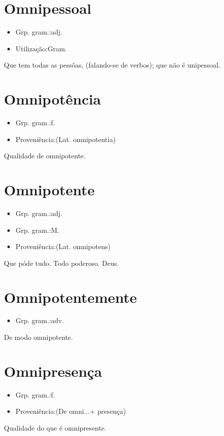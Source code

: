 \section{Omnipessoal}
\begin{itemize}
\item {Grp. gram.:adj.}
\end{itemize}
\begin{itemize}
\item {Utilização:Gram.}
\end{itemize}
Que tem todas as pessôas, (falando-se de verbos); que não é unipessoal.
\section{Omnipotência}
\begin{itemize}
\item {Grp. gram.:f.}
\end{itemize}
\begin{itemize}
\item {Proveniência:(Lat. \textunderscore omnipotentia\textunderscore )}
\end{itemize}
Qualidade de omnipotente.
\section{Omnipotente}
\begin{itemize}
\item {Grp. gram.:adj.}
\end{itemize}
\begin{itemize}
\item {Grp. gram.:M.}
\end{itemize}
\begin{itemize}
\item {Proveniência:(Lat. \textunderscore omnipotens\textunderscore )}
\end{itemize}
Que póde tudo.
Todo poderoso.
Deus.
\section{Omnipotentemente}
\begin{itemize}
\item {Grp. gram.:adv.}
\end{itemize}
De modo omnipotente.
\section{Omnipresença}
\begin{itemize}
\item {Grp. gram.:f.}
\end{itemize}
\begin{itemize}
\item {Proveniência:(De \textunderscore omni...\textunderscore  + \textunderscore presença\textunderscore )}
\end{itemize}
Qualidade do que é omnipresente.
